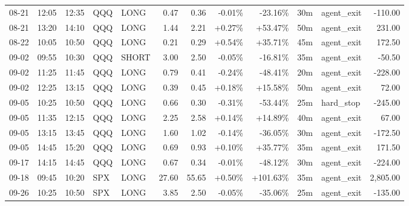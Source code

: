 \documentclass[11pt,a4paper,twoside]{article}
\begin{document}
\begin{center}
\begin{longtable}{>{\color{txtmain}}l l l l l r r r r r >{\color{txtmain}}l r}
08-21 & 12:05 & 12:35 & QQQ & LONG & 0.47 & 0.36 & \textcolor{lossred}{-0.01\%} & \textcolor{lossred}{-23.16\%} & 30m & agent\_exit & \textcolor{lossred}{-110.00} \\
08-21 & 13:20 & 14:10 & QQQ & LONG & 1.44 & 2.21 & \textcolor{wingreen}{+0.27\%} & \textcolor{wingreen}{+53.47\%} & 50m & agent\_exit & \textcolor{wingreen}{231.00} \\
08-22 & 10:05 & 10:50 & QQQ & LONG & 0.21 & 0.29 & \textcolor{wingreen}{+0.54\%} & \textcolor{wingreen}{+35.71\%} & 45m & agent\_exit & \textcolor{wingreen}{172.50} \\
09-02 & 09:55 & 10:30 & QQQ & SHORT & 3.00 & 2.50 & \textcolor{lossred}{-0.05\%} & \textcolor{lossred}{-16.81\%} & 35m & agent\_exit & \textcolor{lossred}{-50.50} \\
09-02 & 11:25 & 11:45 & QQQ & LONG & 0.79 & 0.41 & \textcolor{lossred}{-0.24\%} & \textcolor{lossred}{-48.41\%} & 20m & agent\_exit & \textcolor{lossred}{-228.00} \\
09-02 & 12:25 & 13:15 & QQQ & LONG & 0.39 & 0.45 & \textcolor{wingreen}{+0.18\%} & \textcolor{wingreen}{+15.58\%} & 50m & agent\_exit & \textcolor{wingreen}{72.00} \\
09-05 & 10:25 & 10:50 & QQQ & LONG & 0.66 & 0.30 & \textcolor{lossred}{-0.31\%} & \textcolor{lossred}{-53.44\%} & 25m & hard\_stop & \textcolor{lossred}{-245.00} \\
09-05 & 11:35 & 12:15 & QQQ & LONG & 2.25 & 2.58 & \textcolor{wingreen}{+0.14\%} & \textcolor{wingreen}{+14.89\%} & 40m & agent\_exit & \textcolor{wingreen}{67.00} \\
09-05 & 13:15 & 13:45 & QQQ & LONG & 1.60 & 1.02 & \textcolor{lossred}{-0.14\%} & \textcolor{lossred}{-36.05\%} & 30m & agent\_exit & \textcolor{lossred}{-172.50} \\
09-05 & 14:45 & 15:20 & QQQ & LONG & 0.69 & 0.93 & \textcolor{wingreen}{+0.10\%} & \textcolor{wingreen}{+35.77\%} & 35m & agent\_exit & \textcolor{wingreen}{171.50} \\
09-17 & 14:15 & 14:45 & QQQ & LONG & 0.67 & 0.34 & \textcolor{lossred}{-0.01\%} & \textcolor{lossred}{-48.12\%} & 30m & agent\_exit & \textcolor{lossred}{-224.00} \\
09-18 & 09:45 & 10:20 & SPX & LONG & 27.60 & 55.65 & \textcolor{wingreen}{+0.50\%} & \textcolor{wingreen}{+101.63\%} & 35m & agent\_exit & \textcolor{wingreen}{2,805.00} \\
09-26 & 10:25 & 10:50 & SPX & LONG & 3.85 & 2.50 & \textcolor{lossred}{-0.05\%} & \textcolor{lossred}{-35.06\%} & 25m & agent\_exit & \textcolor{lossred}{-135.00} \\

\end{longtable}
\end{center}
\end{document}
